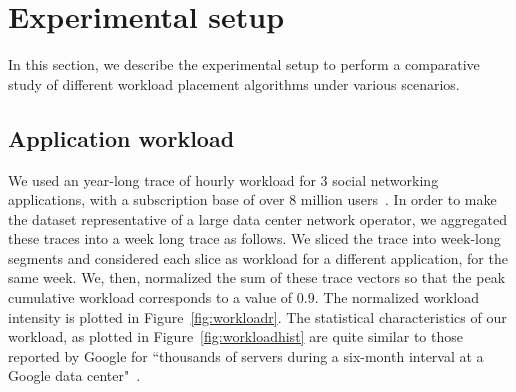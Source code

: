 %
%

\section{Experimental setup}
\label{sec:experiments} 
In this section, we describe the experimental setup to perform a comparative study of different workload placement algorithms under various scenarios.

\subsection{Application workload}
We used an year-long trace of hourly workload for $3$ social networking applications, with a subscription base of over $8$ million users~\cite{Nazir:2008:UFM:1452520.1452527}. In order to make the dataset representative of a large data center network operator, we aggregated these traces into a week long trace as follows. We sliced the trace into week-long segments and considered each slice as workload for a different application, for the same week. We, then, normalized the sum of these trace vectors so that the peak cumulative workload corresponds to a value of $0.9$. The normalized workload intensity is plotted in Figure~\ref{fig:workloadr}. The statistical characteristics of our workload, as plotted in Figure~\ref{fig:workloadhist} are quite similar to those reported by Google for ``thousands of servers during a six-month interval at a Google data center"~\cite{10.1109/MC.2007.443}.

